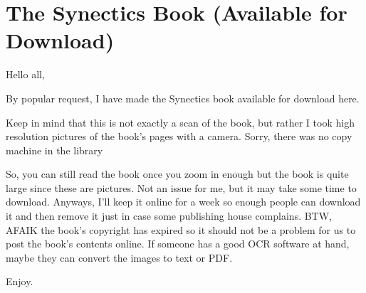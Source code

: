 \chapter{The Synectics Book (Available for Download)}

\begin{refsection}

Hello all,

By popular request, I have made the Synectics book available for download here.\textsuperscript{\cite{urlb1648fd1}}

Keep in mind that this is not exactly a scan of the book, but rather I took high resolution pictures of the book's pages with a camera. Sorry, there was no copy machine in the library

So, you can still read the book once you zoom in enough but the book is quite large since these are pictures. Not an issue for me, but it may take some time to download. Anyways, I'll keep it online for a week so enough people can download it and then remove it just in case some publishing house complains. BTW, AFAIK the book's copyright has expired so it should not be a problem for us to post the book's contents online. If someone has a good OCR software at hand, maybe they can convert the images to text or PDF.

Enjoy.

\printbibliography[heading=subbibliography]

\end{refsection}